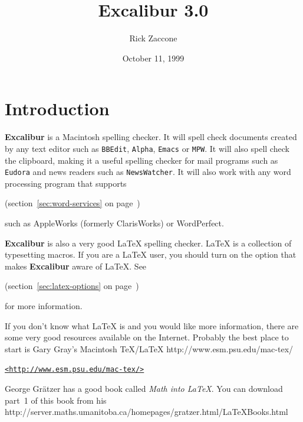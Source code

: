﻿\documentclass[11pt,titlepage]{article}
\newcommand{\ex}{\textbf{Excalibur}}
\begin{document}
\title{Excalibur 3.0}
\author{Rick Zaccone}
\date{October 11, 1999}
\tableofcontents
\newpage
{}
\maketitle
\sloppy

\section{Introduction}

\ex{} is a Macintosh spelling checker.  It will spell check documents
created by any text editor such as \texttt{BBEdit}, \texttt{Alpha},
\texttt{Emacs} or \texttt{MPW}.  It will also spell check the
clipboard, making it a useful spelling checker for mail programs such
as \texttt{Eudora} and news readers such as \texttt{NewsWatcher}.  It
will also work with any word processing program that supports
\begin{latexonly}
  (section~\ref{sec:word-services} on
  page~\pageref{sec:word-services})
\end{latexonly}
such as AppleWorks (formerly ClarisWorks) or WordPerfect.

\ex{} is also a very good \LaTeX{} spelling checker.  \LaTeX{} is a
collection of typesetting macros.  If you are a \LaTeX{} user, you
should turn on the option that makes \ex{} aware of \LaTeX.  See
\begin{latexonly}
  (section~\ref{sec:latex-options} on
  page~\pageref{sec:latex-options})
\end{latexonly}
for more information.

If you don't know what \LaTeX{} is and you would like more
information, there are some very good resources available on the
Internet.  Probably the best place to start is Gary Gray's
Macintosh \TeX/\LaTeX{} 
{http://www.esm.psu.edu/mac-tex/}
\begin{latexonly}
\begin{alltt}
\url{<http://www.esm.psu.edu/mac-tex/>}
\end{alltt}
\end{latexonly}

George Gr\"{a}tzer has a good book called \emph{Math into \LaTeX}.
You can download part~1 of this book from his 
{http://server.maths.umanitoba.ca/homepages/gratzer.html/LaTeXBooks.html}
\end{document}
